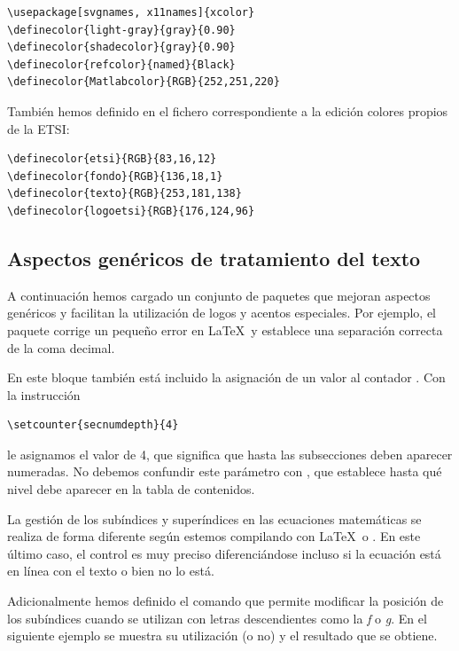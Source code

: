 \begin{lstlisting}[frame=none]
\usepackage[svgnames, x11names]{xcolor}
\definecolor{light-gray}{gray}{0.90}
\definecolor{shadecolor}{gray}{0.90}
\definecolor{refcolor}{named}{Black}
\definecolor{Matlabcolor}{RGB}{252,251,220}
\end{lstlisting}
%
También hemos definido en el fichero correspondiente a la edición colores propios de la ETSI:

\begin{lstlisting}[frame=none]
\definecolor{etsi}{RGB}{83,16,12}
\definecolor{fondo}{RGB}{136,18,1}
\definecolor{texto}{RGB}{253,181,138}
\definecolor{logoetsi}{RGB}{176,124,96}
\end{lstlisting}

\subsection{Aspectos genéricos de tratamiento del texto}
A continuación hemos cargado un conjunto de paquetes que mejoran aspectos genéricos y facilitan la utilización de logos y acentos especiales.  Por ejemplo, el paquete  corrige un pequeño error en \LaTeX\ y establece una separación correcta de la coma decimal.

En este bloque también está incluido la asignación de un valor al contador . Con la instrucción 

\begin{lstlisting}[frame=none]
\setcounter{secnumdepth}{4}
\end{lstlisting}
%
le asignamos el valor de 4, que significa que hasta las  subsecciones deben aparecer numeradas. No debemos confundir este parámetro con  , que establece hasta qué nivel debe aparecer en la tabla de contenidos. 

La gestión de los subíndices y superíndices en las ecuaciones matemáticas se realiza de forma diferente según estemos compilando con \LaTeX\ o \LuaLaTeX . En este último caso, el control es muy preciso diferenciándose incluso si la ecuación está en línea con el texto o bien no lo está.

Adicionalmente hemos definido el comando  que permite modificar la posición de los subíndices cuando se utilizan con letras descendientes como la \emph{f} o \emph{g}. En el siguiente ejemplo se muestra su utilización (o no) y el resultado que se obtiene.

